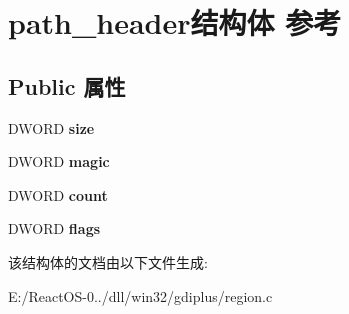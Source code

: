 \hypertarget{structpath__header}{}\section{path\+\_\+header结构体 参考}
\label{structpath__header}
\subsection*{Public 属性}
\begin{DoxyCompactItemize}
\item 
\mbox{\label{structpath__header_a2e90f9c96c9a9bde58721973e1bb001c}} 
D\+W\+O\+RD {\bfseries size}
\item 
\mbox{\label{structpath__header_acd0f2e1542bef8ccc602b467458c1895}} 
D\+W\+O\+RD {\bfseries magic}
\item 
\mbox{\label{structpath__header_a79ffc0d6e6867dc14b8fbd5f69b3bfd0}} 
D\+W\+O\+RD {\bfseries count}
\item 
\mbox{\label{structpath__header_af93b169c331e343bea546be0d7892340}} 
D\+W\+O\+RD {\bfseries flags}
\end{DoxyCompactItemize}


该结构体的文档由以下文件生成\+:\begin{DoxyCompactItemize}
\item 
E\+:/\+React\+O\+S-\/0../dll/win32/gdiplus/region.\+c\end{DoxyCompactItemize}
